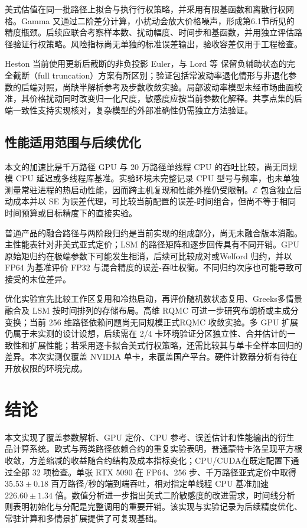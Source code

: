 \documentclass[UTF8,a4paper,zihao=5,fontset=none]{ctexart}
\begin{document}
美式估值在同一批路径上拟合与执行行权策略，并采用有限基函数和离散行权网格。Gamma 又通过二阶差分计算，小扰动会放大价格噪声，形成第6.1节所见的精度瓶颈。后续应联合考察样本数、扰动幅度、时间步和基函数，并用独立评估路径验证行权策略。风险指标尚无单独的标准误差输出，验收容差仅用于工程检查。


Heston 当前使用更新后截断的非负投影 Euler，与 Lord 等 \cite{r11} 保留负辅助状态的完全截断（full truncation）方案有所区别；验证包括常波动率退化情形与非退化参数的后端对照，尚缺半解析参考及步数收敛实验。局部波动率模型未经市场曲面校准，其价格扰动同时改变归一化尺度，敏感度应按当前参数化解释。共享点集的后端一致性支持实现核对，复杂模型的外部准确性仍需独立方法验证。


\subsection{性能适用范围与后续优化}

本文的加速比是千万路径 GPU 与 20 万路径单线程 CPU 的吞吐比较，尚无同规模 CPU 延迟或多线程库基准。实验环境未完整记录 CPU 型号与频率，也未单独测量常驻进程的热启动性能，因而跨主机复现和性能外推仍受限制。$\mathcal E$ 包含独立启动成本并以 SE 为误差代理，可比较当前配置的误差-时间组合，但尚不等于相同时间预算或目标精度下的直接实验。


普通产品的融合路径与两阶段归约是当前实现的组成部分，尚无未融合版本消融。主性能表针对非美式亚式定价；LSM 的路径矩阵和逐步回传具有不同开销。GPU 原始矩归约在极端参数下可能发生相消，后续可比较成对或Welford 归约，并以 FP64 为基准评价 FP32 与混合精度的误差-吞吐权衡。不同归约次序也可能导致可接受的末位差异。


优化实验宜先比较工作区复用和冷热启动，再评价随机数状态复用、Greeks多情景融合及 LSM 按时间排列的存储布局。高维 RQMC 可进一步研究布朗桥或主成分变换；当前 256 维路径依赖问题尚无同规模正式RQMC 收敛实验。多 GPU 扩展仍属于未实测的设计设想，后续需在 2/4 卡环境验证分区独立性、合并估计的一致性和扩展性能；若采用逐卡拟合美式行权策略，还需比较其与单卡全样本回归的差异。本次实测仅覆盖 NVIDIA 单卡，未覆盖国产平台。硬件计数器分析有待在开放权限的环境完成。


\section{结论}

本文实现了覆盖参数解析、GPU 定价、CPU 参考、误差估计和性能输出的衍生品计算系统。欧式与两类路径依赖合约的重复实验表明，普通蒙特卡洛呈现平方根收敛，方差缩减的收益随合约结构及成本指标变化；CPU/CUDA在既定配置下通过全部 32 项检查。单张 RTX 5090 在 FP64、256 步、千万路径亚式定价中取得 $35.53\pm0.18$ 百万路径/秒的端到端吞吐，相对指定单线程 CPU 基准加速 $226.60\pm1.34$ 倍。数值分析进一步指出美式二阶敏感度的改进需求，时间线分析则表明初始化与分配是完整调用的重要开销。该实现与实验记录为后续精度优化、常驻计算和多情景扩展提供了可复现基础。
\end{document}
